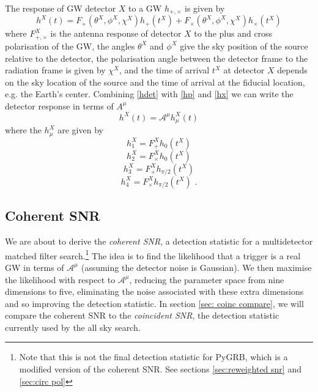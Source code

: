 \documentclass[11pt]{cuthesis}
\begin{document}
The response of GW detector $X$ to a GW $h_{+,\times}$ is given by
\begin{equation} \label{hdet}
h^X(t) = F_+(\theta^X,\phi^X,\chi^X) h_+(t^X) + F_\times(\theta^X,\phi^X,\chi^X) h_\times (t^X)
\end{equation}
where $F_{+,\times}^X$ is the antenna response of detector $X$ to the plus and cross polarisation of the GW, the angles $\theta^X$ and $\phi^X$ give the sky position of the source relative to the detector, the polarisation angle between the detector frame to the radiation frame is given by $\chi^X$, and the time of arrival $t^X$ at detector $X$ depends on the sky location of the source and the time of arrival at the fiducial location, e.g. the Earth's center. Combining \ref{hdet} with \ref{hp} and \ref{hx} we can write the detector response in terms of $A^\mu$
\begin{equation} \label{h in A}
h^X(t) = \mathcal{A}^\mu h_\mu^X(t) 
\end{equation}
where the $h_\mu^X$ are given by
\begin{equation}
h_1^X = F_+^X h_0(t^X) 
\end{equation}
\begin{equation}
h_2^X = F_\times^X h_0(t^X) 
\end{equation}
\begin{equation}
h_3^X = F_+^X h_{\pi/2}(t^X) 
\end{equation}
\begin{equation}
h_4^X = F_\times^X h_{\pi/2}(t^X) \textbf{ .} 
\end{equation}

\subsection{Coherent SNR} \label{sec:coh snr}
We are about to derive the \textit{coherent SNR}, a detection statistic for a multidetector matched filter search.\footnote{Note that this is not the final detection statistic for PyGRB, which is a modified version of the coherent SNR. See sections \ref{sec:reweighted snr} and \ref{sec:circ pol}} The idea is to find the likelihood that a trigger is a real GW in terms of $\mathcal{A}^\mu$ (assuming the detector noise is Gaussian). We then maximise the likelihood with respect to $\mathcal{A}^\mu$, reducing the parameter space from nine dimensions to five, eliminating the noise associated with these extra dimensions and so improving the detection statistic. In section \ref{sec: coinc compare}, we will compare the coherent SNR to the \textit{coincident SNR}, the detection statistic currently used by the all sky search. 
\end{document}
